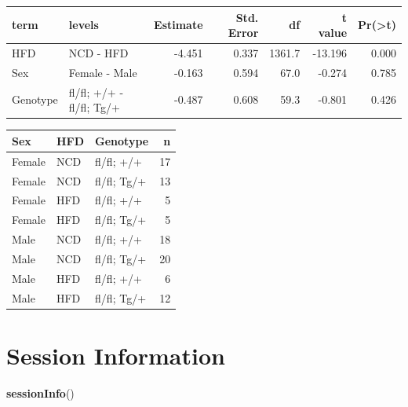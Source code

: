 \documentclass[]{article}
\newenvironment{Shaded}{\begin{snugshade}}{\end{snugshade}}
\newcommand{\KeywordTok}[1]{\textcolor[rgb]{0.13,0.29,0.53}{\textbf{#1}}}
\newcommand{\NormalTok}[1]{#1}
\begin{document}
\begin{longtable}[]{@{}llrrrrr@{}}
\toprule
term & levels & Estimate & Std. Error & df & t value &
Pr(\textgreater{}\textbar{}t\textbar{})\tabularnewline
\midrule
\endhead
HFD & NCD - HFD & -4.451 & 0.337 & 1361.7 & -13.196 &
0.000\tabularnewline
Sex & Female - Male & -0.163 & 0.594 & 67.0 & -0.274 &
0.785\tabularnewline
Genotype & fl/fl; +/+ - fl/fl; Tg/+ & -0.487 & 0.608 & 59.3 & -0.801 &
0.426\tabularnewline
\bottomrule
\end{longtable}

\begin{longtable}[]{@{}lllr@{}}
\toprule
Sex & HFD & Genotype & n\tabularnewline
\midrule
\endhead
Female & NCD & fl/fl; +/+ & 17\tabularnewline
Female & NCD & fl/fl; Tg/+ & 13\tabularnewline
Female & HFD & fl/fl; +/+ & 5\tabularnewline
Female & HFD & fl/fl; Tg/+ & 5\tabularnewline
Male & NCD & fl/fl; +/+ & 18\tabularnewline
Male & NCD & fl/fl; Tg/+ & 20\tabularnewline
Male & HFD & fl/fl; +/+ & 6\tabularnewline
Male & HFD & fl/fl; Tg/+ & 12\tabularnewline
\bottomrule
\end{longtable}

\section{Session Information}\label{session-information}

\begin{Shaded}
\begin{Highlighting}[]
\KeywordTok{sessionInfo}\NormalTok{()}
\end{Highlighting}
\end{Shaded}
\end{document}
